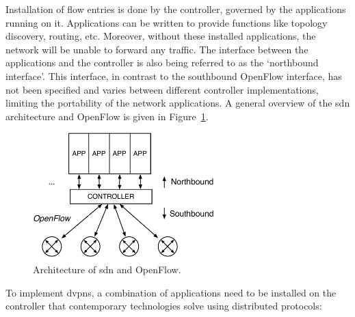 Installation of flow entries is done by the controller, governed by the applications running on it. Applications can be written to provide functions like topology discovery, routing, etc. Moreover, without these installed applications, the network will be unable to forward any traffic. The interface between the applications and the controller is also being referred to as the `northbound interface'. This interface, in contrast to the southbound OpenFlow interface, has not been specified and varies between different controller implementations, limiting the portability of the network applications. A general overview of the \ac{sdn} architecture and OpenFlow is given in Figure~\ref{fig:of-arch}.

\begin{figure}[!h]
	\centering
	\includegraphics[width=7cm]{./includes/of-arch.pdf}
	\caption{Architecture of \ac{sdn} and OpenFlow.}
	\label{fig:of-arch}
\end{figure}

To implement \acp{dvpn}, a combination of applications need to be installed on the controller that contemporary technologies solve using distributed protocols:


